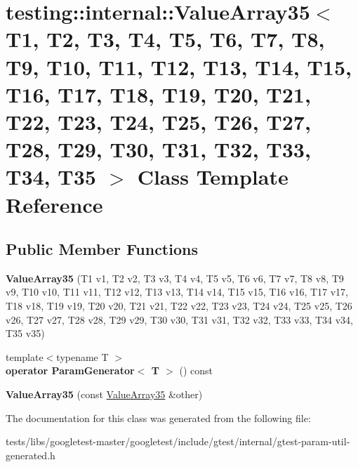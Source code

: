 \hypertarget{classtesting_1_1internal_1_1ValueArray35}{}\section{testing\+:\+:internal\+:\+:Value\+Array35$<$ T1, T2, T3, T4, T5, T6, T7, T8, T9, T10, T11, T12, T13, T14, T15, T16, T17, T18, T19, T20, T21, T22, T23, T24, T25, T26, T27, T28, T29, T30, T31, T32, T33, T34, T35 $>$ Class Template Reference}
\label{classtesting_1_1internal_1_1ValueArray35}
\subsection*{Public Member Functions}
\begin{DoxyCompactItemize}
\item 
\mbox{\label{classtesting_1_1internal_1_1ValueArray35_a1aa394b77ee6359766921841ae15e6fa}} 
{\bfseries Value\+Array35} (T1 v1, T2 v2, T3 v3, T4 v4, T5 v5, T6 v6, T7 v7, T8 v8, T9 v9, T10 v10, T11 v11, T12 v12, T13 v13, T14 v14, T15 v15, T16 v16, T17 v17, T18 v18, T19 v19, T20 v20, T21 v21, T22 v22, T23 v23, T24 v24, T25 v25, T26 v26, T27 v27, T28 v28, T29 v29, T30 v30, T31 v31, T32 v32, T33 v33, T34 v34, T35 v35)
\item 
\mbox{\label{classtesting_1_1internal_1_1ValueArray35_a6cb4565a74e41817523484cd35df5a71}} 
{\footnotesize template$<$typename T $>$ }\\{\bfseries operator Param\+Generator$<$ T $>$} () const
\item 
\mbox{\label{classtesting_1_1internal_1_1ValueArray35_a0deb515bc0893c9b1611a4c6b49003d8}} 
{\bfseries Value\+Array35} (const \hyperlink{classtesting_1_1internal_1_1ValueArray35}{Value\+Array35} \&other)
\end{DoxyCompactItemize}


The documentation for this class was generated from the following file\+:\begin{DoxyCompactItemize}
\item 
tests/libs/googletest-\/master/googletest/include/gtest/internal/gtest-\/param-\/util-\/generated.\+h\end{DoxyCompactItemize}
